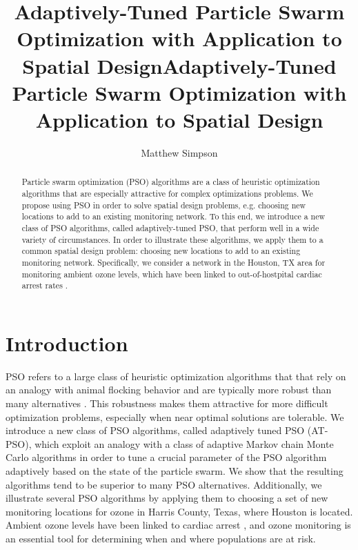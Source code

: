 \documentclass[cmbright]{staauth}
\begin{document}
\blind
{
  \title{Adaptively-Tuned Particle Swarm Optimization with Application to Spatial Design}
  \author{Matthew Simpson\corrauth}
  \address{Department of Statistics, University of Missouri,\\
    146 Middlebush Hall, Columbia, MO 65211-6100}
}\fi

\blind
{
  \title{Adaptively-Tuned Particle Swarm Optimization with Application to Spatial Design}
  \author{}
  \address{}
  \corremail{}
  \received{}
  \accepted{}
}\fi
\begin{abstract}
Particle swarm optimization (PSO) algorithms are a class of heuristic optimization algorithms that are especially attractive for complex optimizations problems. We propose using PSO in order to solve spatial design problems, e.g. choosing new locations to add to an existing monitoring network. To this end, we introduce a new class of PSO algorithms, called adaptively-tuned PSO, that perform well in a wide variety of circumstances. In order to illustrate these algorithms, we apply them to a common spatial design problem: choosing new locations to add to an existing monitoring network. Specifically, we consider a network in the Houston, TX area for monitoring ambient ozone levels, which have been linked to out-of-hostpital cardiac arrest rates \citep{ensor2013case}.
\end{abstract}
\maketitle

\section{Introduction}
PSO refers to a large class of heuristic optimization algorithms that that rely on an analogy with animal flocking behavior and are typically more robust than many alternatives \citep{clerc2002particle,blum2008swarm,clerc2010particle}. This robustness makes them attractive for more difficult optimization problems, especially when near optimal solutions are tolerable. We introduce a new class of PSO algorithms, called adaptively tuned PSO (AT-PSO), which exploit an analogy with a class of adaptive Markov chain Monte Carlo algorithms in order to tune a crucial parameter of the PSO algorithm adaptively based on the state of the particle swarm. We show that the resulting algorithms tend to be superior to many PSO alternatives. Additionally, we illustrate several PSO algorithms by applying them to choosing a set of new monitoring locations for ozone in Harris County, Texas, where Houston is located. Ambient ozone levels have been linked to cardiac arrest \citep{ensor2013case}, and ozone monitoring is an essential tool for determining when and where populations are at risk.
\end{document}
